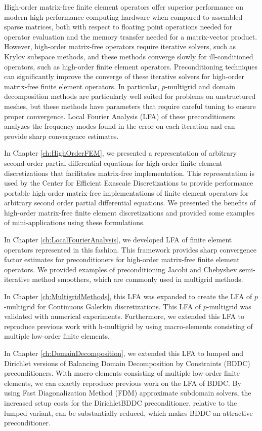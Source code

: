 High-order matrix-free finite element operators offer superior performance on modern high performance computing hardware when compared to assembled sparse matrices, both with respect to floating point operations needed for operator evaluation and the memory transfer needed for a matrix-vector product.
However, high-order matrix-free operators require iterative solvers, such as Krylov subspace methods, and these methods converge slowly for ill-conditioned operators, such as high-order finite element operators.
Preconditioning techniques can significantly improve the converge of these iterative solvers for high-order matrix-free finite element operators.
In particular, $p$-multigrid and domain decomposition methods are particularly well suited for problems on unstructured meshes, but these methods have parameters that require careful tuning to ensure proper convergence.
Local Fourier Analysis (LFA) of these preconditioners analyzes the frequency modes found in the error on each iteration and can provide sharp convergence estimates.

In Chapter \ref{ch:HighOrderFEM}, we presented a representation of arbitrary second-order partial differential equations for high-order finite element discretizations that facilitates matrix-free implementation.
This representation is used by the Center for Efficient Exascale Discretizations to provide performance portable high-order matrix-free implementations of finite element operators for arbitrary second order partial differential equations.
We presented the benefits of high-order matrix-free finite element discretizations and provided some examples of mini-applications using these formulations.

In Chapter \ref{ch:LocalFourierAnalysis}, we developed LFA of finite element operators represented in this fashion.
This framework provides sharp convergence factor estimates for preconditioners for high-order matrix-free finite element operators.
We provided examples of preconditioning Jacobi and Chebyshev semi-iterative method smoothers, which are commonly used in multigrid methods.

In Chapter \ref{ch:MultigridMethods}, this LFA was expanded to create the LFA of $p$-multigrid for Continuous Galerkin discretizations.
This LFA of $p$-multigrid was validated with numerical experiments.
Furthermore, we extended this LFA to reproduce previous work with h-multigrid by using macro-elements consisting of multiple low-order finite elements.

In Chapter \ref{ch:DomainDecomposition}, we extended this LFA to lumped and Dirichlet versions of Balancing Domain Decomposition by Constraints (BDDC) preconditioners.
With macro-elements consisting of multiple low-order finite elements, we can exactly reproduce previous work on the LFA of BDDC.
By using Fast Diagonalization Method (FDM) approximate subdomain solvers, the increased setup costs for the DirichletBDDC preconditioner, relative to the lumped variant, can be substantially reduced, which makes BDDC an attractive preconditioner.

